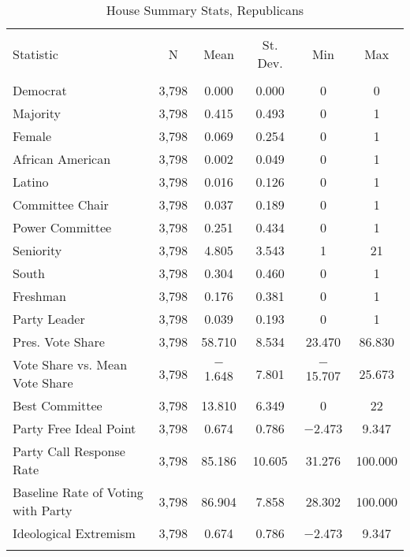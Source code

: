\documentclass[12pt]{article}
\begin{document}
\begin{table}[!htbp] \centering 
	\caption{House Summary Stats, Republicans} 
	\label{} 
	\begin{tabular}{@{\extracolsep{5pt}}lccccc} 
		\\[-1.8ex]\hline 
		\hline \\[-1.8ex] 
		Statistic & \multicolumn{1}{c}{N} & \multicolumn{1}{c}{Mean} & \multicolumn{1}{c}{St. Dev.} & \multicolumn{1}{c}{Min} & \multicolumn{1}{c}{Max} \\ 
		\hline \\[-1.8ex] 
		Democrat & 3,798 & 0.000 & 0.000 & 0 & 0 \\ 
		Majority & 3,798 & 0.415 & 0.493 & 0 & 1 \\ 
		Female & 3,798 & 0.069 & 0.254 & 0 & 1 \\ 
		African American & 3,798 & 0.002 & 0.049 & 0 & 1 \\ 
		Latino & 3,798 & 0.016 & 0.126 & 0 & 1 \\ 
		Committee Chair & 3,798 & 0.037 & 0.189 & 0 & 1 \\ 
		Power Committee & 3,798 & 0.251 & 0.434 & 0 & 1 \\ 
		Seniority & 3,798 & 4.805 & 3.543 & 1 & 21 \\ 
		South & 3,798 & 0.304 & 0.460 & 0 & 1 \\ 
		Freshman & 3,798 & 0.176 & 0.381 & 0 & 1 \\ 
		Party Leader & 3,798 & 0.039 & 0.193 & 0 & 1 \\ 
		Pres. Vote Share & 3,798 & 58.710 & 8.534 & 23.470 & 86.830 \\ 
		Vote Share vs. Mean Vote Share & 3,798 & $-$1.648 & 7.801 & $-$15.707 & 25.673 \\ 
		Best Committee & 3,798 & 13.810 & 6.349 & 0 & 22 \\ 
		Party Free Ideal Point & 3,798 & 0.674 & 0.786 & $-$2.473 & 9.347 \\ 
		Party Call Response Rate & 3,798 & 85.186 & 10.605 & 31.276 & 100.000 \\ 
		Baseline Rate of Voting with Party & 3,798 & 86.904 & 7.858 & 28.302 & 100.000 \\ 
		Ideological Extremism & 3,798 & 0.674 & 0.786 & $-$2.473 & 9.347 \\ 
		\hline \\[-1.8ex] 
	\end{tabular} 
\end{table} 
\end{document}
